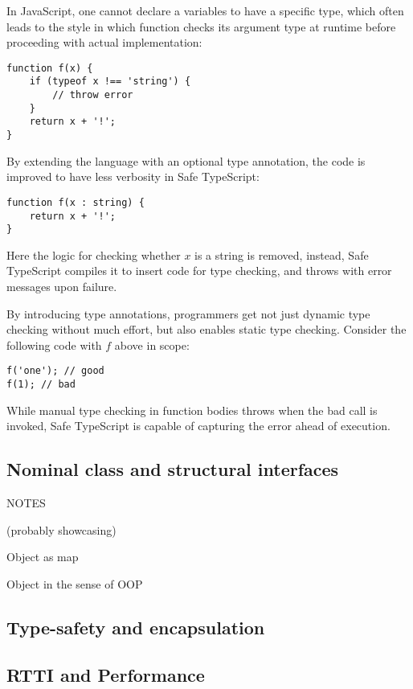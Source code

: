 In JavaScript, one cannot declare a variables to have a specific type,
which often leads to the style in which function checks its argument type at runtime
before proceeding with actual implementation:

\begin{verbatim}
function f(x) {
    if (typeof x !== 'string') {
        // throw error
    }
    return x + '!';
}
\end{verbatim}

By extending the language with an optional type annotation,
the code is improved to have less verbosity in Safe TypeScript: 

\begin{verbatim}
function f(x : string) {
    return x + '!';
}
\end{verbatim}

Here the logic for checking whether $x$ is a string is removed,
instead, Safe TypeScript compiles it to insert code for type checking,
and throws with error messages upon failure.

By introducing type annotations, programmers get not just dynamic type checking without
much effort, but also enables static type checking. Consider the following code with $f$
above in scope:

\begin{verbatim}
f('one'); // good
f(1); // bad
\end{verbatim}

While manual type checking in function bodies throws when the bad call is invoked,
Safe TypeScript is capable of capturing the error ahead of execution.

\subsection{Nominal class and structural interfaces}

NOTES

(probably showcasing)

Object as map

Object in the sense of OOP

\subsection{Type-safety and encapsulation}

\subsection{RTTI and Performance}


